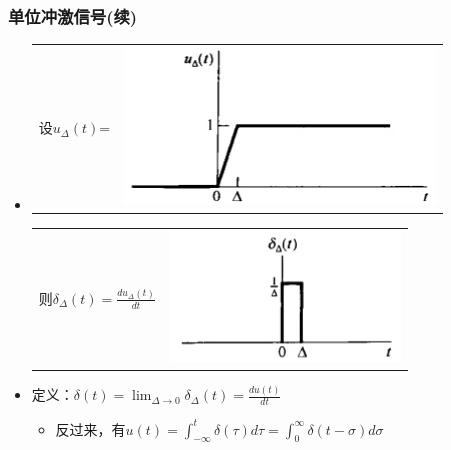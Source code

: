 \documentclass[CJKutf8,dvipsnames,table]{beamer}
\begin{document}
\begin{CJK*}{UTF8}{song}
  \begin{frame}
    \frametitle{单位冲激信号(续)}
    \begin{itemize}
    \item
	\begin{tabular}{ll}
	\raisebox{-.5\height}

    设$u_{\Delta}(t)$=

&
    \includegraphics[valign=m,scale=.4]{uDelta}    \\
    \end{tabular}       
    

	\begin{tabular}{ll}
	\raisebox{-.5\height}

    则$\delta_{\Delta}(t)=\frac{du_{\Delta}(t)}{dt}$

&
    \includegraphics[valign=m,scale=.4]{deltaDelta}    \\
    \end{tabular}       
    
    \item 定义：$\delta(t)=\lim_{\Delta\to 0}\delta_{\Delta}(t)=\frac{du(t)}{dt}$
    \begin{itemize}
    \item 反过来，有$u(t)=\int_{-\infty}^{t}\delta(\tau)d\tau=\int_{0}^{\infty}\delta(t-\sigma)d\sigma$
    \end{itemize}
    \end{itemize}
  \end{frame}


\end{CJK*}
\end{document}
